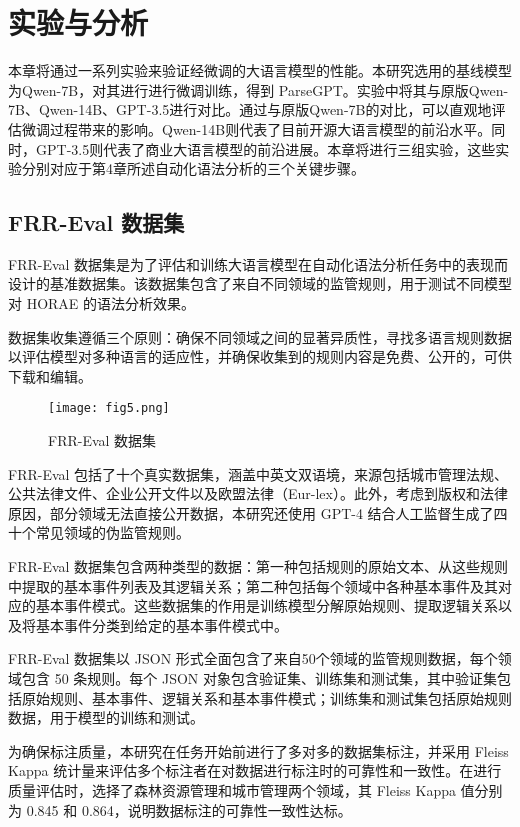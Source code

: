 \newpage

\section{实验与分析}

本章将通过一系列实验来验证经微调的大语言模型的性能。本研究选用的基线模型为Qwen-7B，对其进行进行微调训练，得到 ParseGPT。实验中将其与原版Qwen-7B、Qwen-14B、GPT-3.5\cite{koubaa2023gpt}进行对比。通过与原版Qwen-7B的对比，可以直观地评估微调过程带来的影响。Qwen-14B则代表了目前开源大语言模型的前沿水平。同时，GPT-3.5则代表了商业大语言模型的前沿进展。本章将进行三组实验，这些实验分别对应于第4章所述自动化语法分析的三个关键步骤。

\subsection{FRR-Eval 数据集}

FRR-Eval 数据集是为了评估和训练大语言模型在自动化语法分析任务中的表现而设计的基准数据集。该数据集包含了来自不同领域的监管规则，用于测试不同模型对 HORAE 的语法分析效果。

数据集收集遵循三个原则：确保不同领域之间的显著异质性，寻找多语言规则数据以评估模型对多种语言的适应性，并确保收集到的规则内容是免费、公开的，可供下载和编辑。

\begin{figure*}[ht]
    \centering
    \texttt{[image: fig5.png]}
    \caption{FRR-Eval 数据集}
\end{figure*}

FRR-Eval 包括了十个真实数据集，涵盖中英文双语境，来源包括城市管理法规、公共法律文件、企业公开文件以及欧盟法律（Eur-lex）。此外，考虑到版权和法律原因，部分领域无法直接公开数据，本研究还使用 GPT-4 结合人工监督生成了四十个常见领域的伪监管规则。

FRR-Eval 数据集包含两种类型的数据：第一种包括规则的原始文本、从这些规则中提取的基本事件列表及其逻辑关系；第二种包括每个领域中各种基本事件及其对应的基本事件模式。这些数据集的作用是训练模型分解原始规则、提取逻辑关系以及将基本事件分类到给定的基本事件模式中。

FRR-Eval 数据集以 JSON 形式全面包含了来自50个领域的监管规则数据，每个领域包含 50 条规则。每个 JSON 对象包含验证集、训练集和测试集，其中验证集包括原始规则、基本事件、逻辑关系和基本事件模式；训练集和测试集包括原始规则数据，用于模型的训练和测试。

为确保标注质量，本研究在任务开始前进行了多对多的数据集标注，并采用 Fleiss Kappa\cite{falotico2015fleiss} 统计量来评估多个标注者在对数据进行标注时的可靠性和一致性。在进行质量评估时，选择了森林资源管理和城市管理两个领域，其 Fleiss Kappa 值分别为 0.845 和 0.864，说明数据标注的可靠性一致性达标。

